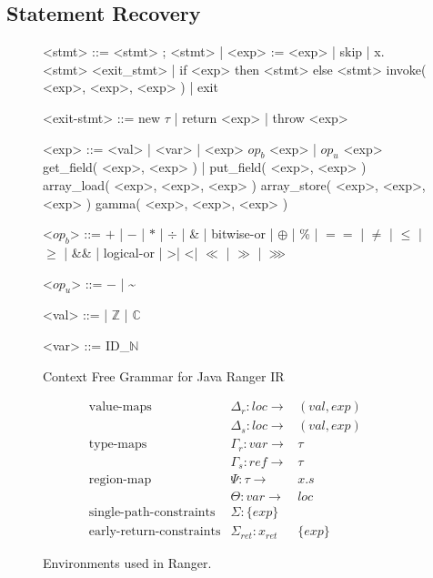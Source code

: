 \subsection{Statement Recovery}
\label{sec:static-analysis}
\begin{figure}
\begin{grammar}
<stmt> ::= <stmt> ; <stmt> | <exp> := <exp> | skip | x.<stmt> 
\alt <exit_stmt> | if <exp> then <stmt> else <stmt> 
\alt invoke( <exp>, <exp>, <exp> )  | exit

<exit-stmt> ::=  new $\tau$  | return <exp> |  throw <exp> 

<exp>  ::= <val> | <var> | <exp> $op_b$ <exp> | $op_u$ <exp>
\alt get_field( <exp>, <exp> ) | put_field( <exp>, <exp> )
\alt array_load( <exp>, <exp>, <exp> )  
\alt array_store( <exp>, <exp>, <exp> ) 
\alt gamma( <exp>, <exp>, <exp> ) 

<$op_b$> ::= $+$ | $-$ | $*$ | $\div$ | \& | bitwise-or | $\oplus$ | \% | $==$ | $\neq$ | $\leq$ | $\geq$ | \&\& | logical-or | \textgreater | \textless | $\ll$ | $\gg$ | $\ggg$

<$op_u$> ::= $-$ | \textasciitilde

<val> ::= \unit | $\mathbb{Z}$ |  $\mathbb{C}$

<var> ::= ID_$\mathbb{N}$
\end{grammar}
\caption{Context Free Grammar for Java Ranger IR}
\label{fig:grammar}
\end{figure}


\begin{figure}
$$
\begin{array}{lllll}
\text{value-maps} & \Delta_r: loc \rightarrow & ( val, exp) &&
\\
& \Delta_s: loc \rightarrow & ( val, exp) &&
\\
\text{type-maps}  & \Gamma_r: var \rightarrow & \tau & &
\\
& \Gamma_s: ref \rightarrow & \tau&&
\\
\text{region-map} & \Psi: \tau \rightarrow & x.s &&
\\
& \Theta: var \rightarrow & loc &&
\\
\text{single-path-constraints} & \Sigma: \{exp\} &  &  & 
\\
\text{early-return-constraints} & \Sigma_{ret}: x_{ret} & \{exp\} &  & 
\end{array}
$$
\caption{Environments used in Ranger.}
\label{fig:environment}
\end{figure}

